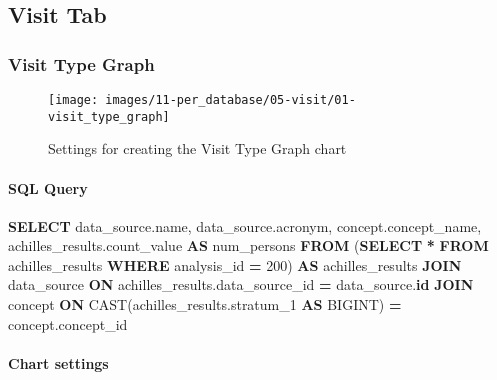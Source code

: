 \documentclass[
]{book}
\newenvironment{Shaded}{\begin{snugshade}}{\end{snugshade}}
\newcommand{\DecValTok}[1]{\textcolor[rgb]{0.00,0.00,0.81}{#1}}
\newcommand{\FunctionTok}[1]{\textcolor[rgb]{0.00,0.00,0.00}{#1}}
\newcommand{\KeywordTok}[1]{\textcolor[rgb]{0.13,0.29,0.53}{\textbf{#1}}}
\newcommand{\NormalTok}[1]{#1}
\newcommand{\OperatorTok}[1]{\textcolor[rgb]{0.81,0.36,0.00}{\textbf{#1}}}
\begin{document}
\hypertarget{visit-tab}{%
\subsection*{Visit Tab}\label{visit-tab}}

\hypertarget{visit-type-graph}{%
\subsubsection*{Visit Type Graph}\label{visit-type-graph}}

\begin{figure}
\texttt{[image: images/11-per\_database/05-visit/01-visit\_type\_graph]} \caption{Settings for creating the Visit Type Graph chart}\label{fig:visitTypeGraph}
\end{figure}

\hypertarget{sql-query-5}{%
\paragraph*{SQL Query}\label{sql-query-5}}

\begin{Shaded}
\begin{Highlighting}[]
\KeywordTok{SELECT}
\NormalTok{  data\_source.name,}
\NormalTok{  data\_source.acronym,}
\NormalTok{  concept.concept\_name,}
\NormalTok{  achilles\_results.count\_value }\KeywordTok{AS}\NormalTok{ num\_persons}
\KeywordTok{FROM}\NormalTok{ (}\KeywordTok{SELECT} \OperatorTok{*} \KeywordTok{FROM}\NormalTok{ achilles\_results }\KeywordTok{WHERE}\NormalTok{ analysis\_id }\OperatorTok{=} \DecValTok{200}\NormalTok{) }\KeywordTok{AS}\NormalTok{ achilles\_results}
\KeywordTok{JOIN}\NormalTok{ data\_source }\KeywordTok{ON}\NormalTok{ achilles\_results.data\_source\_id }\OperatorTok{=}\NormalTok{ data\_source.}\KeywordTok{id}
\KeywordTok{JOIN}\NormalTok{ concept }\KeywordTok{ON} \FunctionTok{CAST}\NormalTok{(achilles\_results.stratum\_1 }\KeywordTok{AS}\NormalTok{ BIGINT) }\OperatorTok{=}\NormalTok{ concept.concept\_id}
\end{Highlighting}
\end{Shaded}

\hypertarget{chart-settings-6}{%
\paragraph*{Chart settings}\label{chart-settings-6}}
\end{document}
